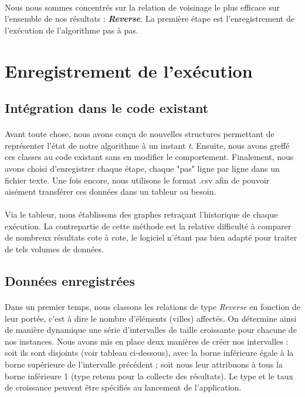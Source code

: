 \documentclass[a4paper,10pt]{report}
\begin{document}
\paragraph{}
Nous nous sommes concentrés sur la relation de voisinage le plus efficace sur
l'ensemble de nos résultats : \textbf{\textit{Reverse}}. La première étape est
l'enregistrement de l'exécution de l'algorithme pas à pas.



\section{Enregistrement de l'exécution}
\subsection{Intégration dans le code existant}

\paragraph{}
  Avant toute chose, nous avons conçu de nouvelles structures permettant de
représenter l'état de notre algorithme à un instant \textit{t}. Ensuite, nous
avons greffé ces classes au code existant sans en modifier le comportement.
Finalement, nous avons choisi d'enregistrer chaque étape, chaque "pas" ligne par
ligne dans un fichier texte. Une fois encore, nous utilisons le format .csv afin
de pouvoir aisément transférer ces données dans un tableur au besoin.

\paragraph{}
  Via le tableur, nous établissons des graphes retraçant l'historique de chaque
exécution. La contrepartie de cette méthode est la relative difficulté à
comparer de nombreux résultats cote à cote, le logiciel n'étant pas bien adapté
pour traiter de tels volumes de données.

\subsection{Données enregistrées}

\paragraph{}
  Dans un premier temps, nous classons les relations de type \textit{Reverse}
en fonction de leur portée, c'est à dire le nombre d'éléments (villes) affectés.
On détermine ainsi de manière dynamique une série d'intervalles de taille
croissante pour chacune de nos instances. Nous avons mis en place deux manières
de créer nos intervalles : soit ils sont disjoints (voir tableau ci-dessous),
avec la borne inférieure égale à la borne supérieure de l'intervalle précédent ;
soit nous leur attribuons à tous la borne inférieure 1 (type retenu pour la
collecte des résultats). Le type et le taux de croissance peuvent être spécifiés
au lancement de l'application.
\end{document}
